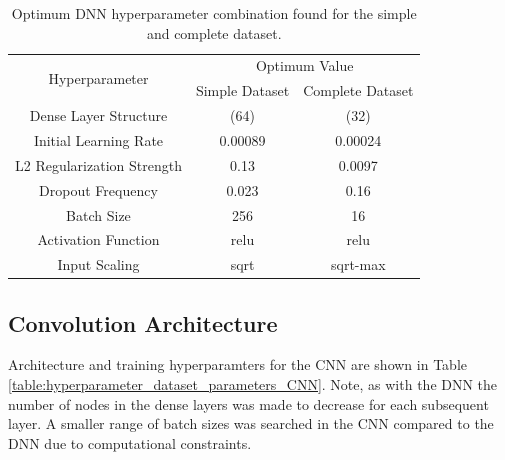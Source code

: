 \begin{table}[H]
\centering
\caption{Optimum DNN hyperparameter combination found for the simple and complete dataset.}
\label{table:hyperparameter_dataset_parameters_DNN}
\begin{tabular}{ccc}
\multirow{2}{*}{Hyperparameter} & \multicolumn{2}{c}{Optimum Value} \\
 & Simple Dataset & Complete Dataset \\ \hline
Dense Layer Structure & (64) & (32) \\
Initial Learning Rate & 0.00089 & 0.00024 \\
L2 Regularization Strength & 0.13 & 0.0097 \\
Dropout Frequency & 0.023 & 0.16 \\
Batch Size & 256 & 16 \\
Activation Function & relu & relu \\
Input Scaling & sqrt & sqrt-max
\end{tabular}
\end{table}





\subsection{Convolution Architecture}

Architecture and training hyperparamters for the CNN are shown in Table \ref{table:hyperparameter_dataset_parameters_CNN}. Note, as with the DNN the number of nodes in the dense layers was made to decrease for each subsequent layer. A smaller range of batch sizes was searched in the CNN compared to the DNN due to computational constraints.

